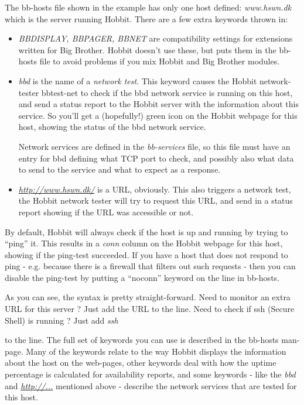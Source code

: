  The bb-hosts file shown in the example has only one host defined: \emph{www.hswn.dk}
 which is the server running Hobbit. There are a few extra keywords thrown in:

\begin{itemize}
\item \emph{BBDISPLAY, BBPAGER, BBNET} are compatibility settings for
  extensions written for Big Brother. Hobbit doesn't use these, but
  puts them in the bb-hosts file to avoid problems if you mix Hobbit
  and Big Brother modules.

\item \emph{bbd}
 is the name of a \emph{network test}. This keyword causes the Hobbit
 network-tester bbtest-net to check if the bbd network service is
 running on this host, and send a status report to the Hobbit server
 with the information about this service. So you'll get a (hopefully!)
 green icon on the Hobbit webpage for this host, showing the status of
 the bbd network service. 

 Network services are defined in the \emph{bb-services} file, so this
 file must have an entry for bbd defining what TCP port to check, and
 possibly also what data to send to the service and what to expect as
 a response.

\item \emph{\url{http://www.hswn.dk/}}
 is a URL, obviously. This also triggers a network test, the Hobbit
 network tester will try to request this URL, and send in a status
 report showing if the URL was accessible or not.


\end{itemize}


 By default, Hobbit will always check if the host is up and running by
 trying to ``ping'' it. This results in a \emph{conn} column on the
 Hobbit webpage for this host, showing if the ping-test succeeded. If
 you have a host that does not respond to ping - e.g. because there is
 a firewall that filters out such requests - then you can disable the
 ping-test by putting a ``noconn'' keyword on the line in bb-hosts.



 As you can see, the syntax is pretty straight-forward. Need to
 monitor an extra URL for this server ? Just add the URL to the
 line. Need to check if ssh (Secure Shell) is running ? Just add
 \emph{ssh}

 to the line. The full set of keywords you can use is described in the
 bb-hosts man-page. Many of the keywords relate to the way Hobbit
 displays the information about the host on the web-pages, other
 keywords deal with how the uptime percentage is calculated for
 availability reports, and some keywords - like the \emph{bbd} and
 \emph{\url{http://...}} mentioned above - describe the network
 services that are tested for this host.

